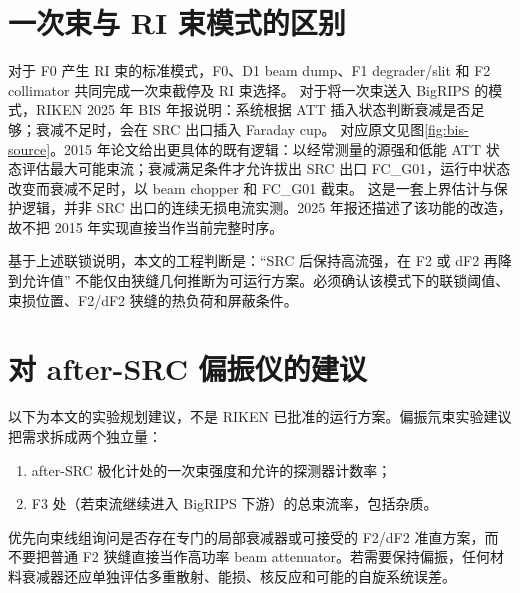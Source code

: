 \documentclass[UTF8,11pt,a4paper]{ctexart}
\begin{document}
\section{一次束与 RI 束模式的区别}

对于 F0 产生 RI 束的标准模式，F0、D1 beam dump、F1 degrader/slit 和 F2 collimator 共同完成一次束截停及 RI 束选择。\cite{bigrips-config,bigrips-focal} 对于将一次束送入 BigRIPS 的模式，RIKEN 2025 年 BIS 年报说明：系统根据 ATT 插入状态判断衰减是否足够；衰减不足时，会在 SRC 出口插入 Faraday cup。\cite{bis} 对应原文见图\ref{fig:bis-source}。2015 年论文给出更具体的既有逻辑：以经常测量的源强和低能 ATT 状态评估最大可能束流；衰减满足条件才允许拔出 SRC 出口 FC\_G01，运行中状态改变而衰减不足时，以 beam chopper 和 FC\_G01 截束。\cite{bis2015} 这是一套上界估计与保护逻辑，并非 SRC 出口的连续无损电流实测。2025 年报还描述了该功能的改造，故不把 2015 年实现直接当作当前完整时序。

\begin{samepage}
基于上述联锁说明，本文的工程判断是：``SRC 后保持高流强，在 F2 或 dF2 再降到允许值'' 不能仅由狭缝几何推断为可运行方案。必须确认该模式下的联锁阈值、束损位置、F2/dF2 狭缝的热负荷和屏蔽条件。
\end{samepage}

\section{对 after-SRC 偏振仪的建议}

以下为本文的实验规划建议，不是 RIKEN 已批准的运行方案。偏振氘束实验建议把需求拆成两个独立量：
\begin{enumerate}
  \item after-SRC 极化计处的一次束强度和允许的探测器计数率；
  \item F3 处（若束流继续进入 BigRIPS 下游）的总束流率，包括杂质。
\end{enumerate}
优先向束线组询问是否存在专门的局部衰减器或可接受的 F2/dF2 准直方案，而不要把普通 F2 狭缝直接当作高功率 beam attenuator。若需要保持偏振，任何材料衰减器还应单独评估多重散射、能损、核反应和可能的自旋系统误差。
\end{document}
